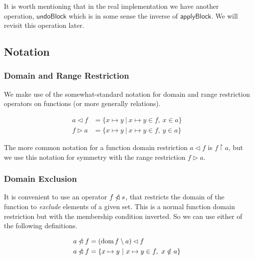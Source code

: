 \documentclass{article}
\newcommand{\restrictdom}{\lhd}
\newcommand{\subtractdom}{\mathbin{\slashed{\restrictdom}}}
\newcommand{\restrictrange}{\rhd}
\DeclareMathOperator{\dom}{dom}
\begin{document}
It is worth mentioning that in the real implementation we have another
operation, $\mathsf{undoBlock}$ which is in some sense the inverse of
$\mathsf{applyBlock}$. We will revisit this operation later.


\subsection{Notation}

\subsubsection{Domain and Range Restriction}

We make use of the somewhat-standard notation for domain and range restriction
operators on functions (or more generally relations).

\begin{equation*}
\begin{split}
a \restrictdom  f  & = \{ x \mapsto y ~|~ x \mapsto y \in f, ~ x \in a \} \\
f \restrictrange a  & = \{ x \mapsto y ~|~ x \mapsto y \in f, ~ y \in a \}
\end{split}
\end{equation*}

The more common notation for a function domain restriction $a \restrictdom f$
is $f \restriction a$, but we use this notation for symmetry with the range
restriction $f \restrictrange a$.

\subsubsection{Domain Exclusion}

It is convenient to use an operator $f \subtractdom s$, that restricts the
domain of the function to \emph{exclude} elements of a given set. This is a
normal function domain restriction but with the membership condition inverted.
So we can use either of the following definitions.

\begin{equation*}
\begin{split}
a \subtractdom f  & = ( \dom f \setminus a ) \restrictdom f \\
a \subtractdom f  & = \{ x \mapsto y ~|~ x \mapsto y \in f, ~ x \notin a \}
\end{split}
\end{equation*}
\end{document}
